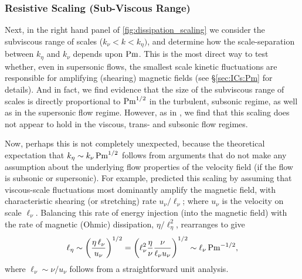 \subsubsection{Resistive Scaling (Sub-Viscous Range)}
\label{sec:results:dissipation:keta}

Next, in the right hand panel of \autoref{fig:dissipation_scaling} we consider the subviscous range of scales ($k_\nu < k < k_\eta)$, and determine how the scale-separation between $k_\eta$ and $k_\nu$ depends upon $\mathrm{Pm}$. This is the most direct way to test whether, even in supersonic flows, the smallest scale kinetic fluctuations are responsible for amplifying (shearing) magnetic fields (see \S\ref{sec:ICs:Pm} for details). And in fact, we find evidence that the size of the subviscous range of scales is directly proportional to $\mathrm{Pm}^{1/2}$ in the turbulent, subsonic regime, as well as in the supersonic flow regime. However, as in , we find that this scaling does not appear to hold in the viscous, trans- and subsonic flow regimes.

Now, perhaps this is not completely unexpected, because the theoretical expectation that $k_\eta \sim k_\nu \,\mathrm{Pm}^{1/2}$ follows from arguments that do not make any assumption about the underlying flow properties of the velocity field (\ie if the flow is subsonic or supersonic). For example, \citet{schekochihin2002spectra} predicted this scaling by assuming that viscous-scale fluctuations most dominantly amplify the magnetic field, with characteristic shearing (or stretching) rate $u_\nu / \ell_\nu$; where $u_\nu$ is the velocity on scale $\ell_\nu$. Balancing this rate of energy injection (into the magnetic field) with the rate of magnetic (Ohmic) dissipation, $\eta / \ell_\eta^2$, rearranges to give
\begin{align}
    \ell_\eta
        \sim \left( \frac{\eta \, \ell_\nu}{u_\nu} \right)^{1/2}
        = \left( \ell_\nu^2 \frac{\eta}{\nu} \frac{\nu}{\ell_\nu u_\nu} \right)^{1/2}
        \sim \ell_\nu \, \mathrm{Pm}^{-1/2}
    , \label{eqn:keta:result}
\end{align}
where $\ell_\nu \sim \nu / u_\nu$ follows from a straightforward unit analysis.

